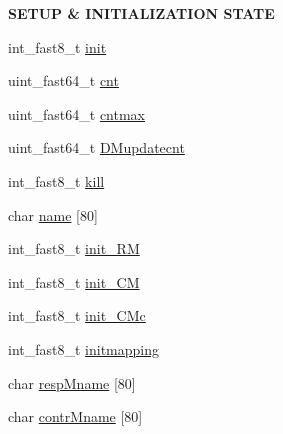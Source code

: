\begin{Indent}{\bf S\+E\+T\+U\+P \& I\+N\+I\+T\+I\+A\+L\+I\+Z\+A\+T\+I\+O\+N S\+T\+A\+T\+E}\par
\begin{DoxyCompactItemize}
\item 
int\+\_\+fast8\+\_\+t \hyperlink{structAOLOOPCONTROL__CONF_a02784d9e824c73ced85f57691d6c0834}{init}
\item 
uint\+\_\+fast64\+\_\+t \hyperlink{structAOLOOPCONTROL__CONF_ad4af9a5a2b3d9f3607566c79aeb8f143}{cnt}
\item 
uint\+\_\+fast64\+\_\+t \hyperlink{structAOLOOPCONTROL__CONF_adda3452da7229a9a8232a76e49850b37}{cntmax}
\item 
uint\+\_\+fast64\+\_\+t \hyperlink{structAOLOOPCONTROL__CONF_a75c84da7246c9027690fbe85dda21ff7}{D\+Mupdatecnt}
\item 
int\+\_\+fast8\+\_\+t \hyperlink{structAOLOOPCONTROL__CONF_aef48e5d352522d499e5bba701f4ba668}{kill}
\item 
char \hyperlink{structAOLOOPCONTROL__CONF_a89011839e5092011c81356159f76b9ac}{name} \mbox{[}80\mbox{]}
\item 
int\+\_\+fast8\+\_\+t \hyperlink{structAOLOOPCONTROL__CONF_a3c07d8fa8eadc3d4318c9c0d211cd03f}{init\+\_\+\+R\+M}
\item 
int\+\_\+fast8\+\_\+t \hyperlink{structAOLOOPCONTROL__CONF_a28afa60e8c9affb521ebce6ad4907308}{init\+\_\+\+C\+M}
\item 
int\+\_\+fast8\+\_\+t \hyperlink{structAOLOOPCONTROL__CONF_a20a14b04e23d2db6946fdc635916fcd2}{init\+\_\+\+C\+Mc}
\item 
int\+\_\+fast8\+\_\+t \hyperlink{structAOLOOPCONTROL__CONF_ae6189ec85542d01a616bb2f48d73f2a3}{initmapping}
\item 
char \hyperlink{structAOLOOPCONTROL__CONF_ad1af43c9e7a9ed5002376c32fd69e16a}{resp\+Mname} \mbox{[}80\mbox{]}
\item 
char \hyperlink{structAOLOOPCONTROL__CONF_a30b003e3e71280aa46e5423021f3c807}{contr\+Mname} \mbox{[}80\mbox{]}
\end{DoxyCompactItemize}
\end{Indent}
